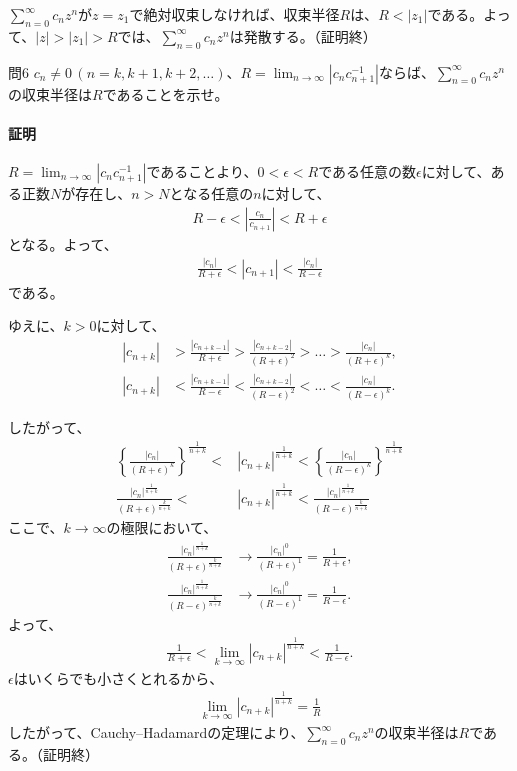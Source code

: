 $\sum_{n=0}^\infty c_nz^n$が$z=z_1$で絶対収束しなければ、収束半径$R$は、$R<|z_1|$である。よって、$|z|>|z_1|>R$では、$\sum_{n=0}^\infty c_nz^n$は発散する。（証明終）

\begin{mysimplebox}{問6}
    $c_n\neq 0\,(n=k, k+1, k+2,\dots)$、$R=\lim_{n\to\infty}|c_nc_{n+1}^{-1}|$ならば、$\sum_{n=0}^\infty c_nz^n$の収束半径は$R$であることを示せ。
\end{mysimplebox}
\paragraph{証明}
$R=\lim_{n\to\infty}|c_nc_{n+1}^{-1}|$であることより、$0<\epsilon<R$である任意の数$\epsilon$に対して、ある正数$N$が存在し、$n>N$となる任意の$n$に対して、
\begin{align*}
    R-\epsilon<\left|\frac{c_n}{c_{n+1}}\right|<R+\epsilon
\end{align*}
となる。よって、
\begin{align*}
    \frac{|c_n|}{R+\epsilon}<|c_{n+1}|<\frac{|c_n|}{R-\epsilon}
\end{align*}    
である。

ゆえに、$k>0$に対して、
\begin{align}
    |c_{n+k}|&>\frac{|c_{n+k-1}|}{R+\epsilon}>\frac{|c_{n+k-2}|}{(R+\epsilon)^2}>\dots>\frac{|c_{n}|}{(R+\epsilon)^k},\label{eq:convR1}\\
    |c_{n+k}|&<\frac{|c_{n+k-1}|}{R-\epsilon}<\frac{|c_{n+k-2}|}{(R-\epsilon)^2}<\dots<\frac{|c_{n}|}{(R-\epsilon)^k}.\label{eq:convR2}
\end{align}

したがって、
\begin{align*}
    \left\{\frac{|c_{n}|}{(R+\epsilon)^k}\right\}^\frac{1}{n+k}<&|c_{n+k}|^\frac{1}{n+k}< \left\{\frac{|c_{n}|}{(R-\epsilon)^k}\right\}^\frac{1}{n+k}\\
    \frac{|c_{n}|^\frac{1}{n+k}}{(R+\epsilon)^\frac{k}{n+k}}<&|c_{n+k}|^\frac{1}{n+k}< \frac{|c_{n}|^\frac{1}{n+k}}{(R-\epsilon)^\frac{k}{n+k}}
\end{align*}
ここで、$k\longrightarrow\infty$の極限において、
\begin{align*}
    \frac{|c_{n}|^\frac{1}{n+k}}{(R+\epsilon)^\frac{k}{n+k}}&\longrightarrow \frac{|c_{n}|^0}{(R+\epsilon)^1}=\frac{1}{R+\epsilon},\\
    \frac{|c_{n}|^\frac{1}{n+k}}{(R-\epsilon)^\frac{k}{n+k}}&\longrightarrow \frac{|c_{n}|^0}{(R-\epsilon)^1}=\frac{1}{R-\epsilon}.
\end{align*}
よって、
\begin{align*}
    \frac{1}{R+\epsilon}<\lim_{k\to\infty}|c_{n+k}|^\frac{1}{n+k}<\frac{1}{R-\epsilon}.
\end{align*}
$\epsilon$はいくらでも小さくとれるから、
\begin{align*}
    \lim_{k\to\infty}|c_{n+k}|^\frac{1}{n+k}=\frac{1}{R}
\end{align*}
したがって、Cauchy--Hadamardの定理により、$\sum_{n=0}^\infty c_nz^n$の収束半径は$R$である。（証明終）

